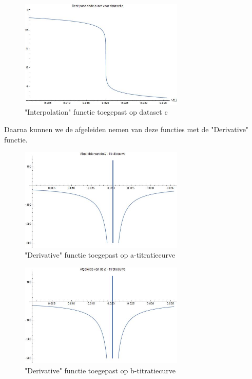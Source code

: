 \documentclass[10pt,twoside]{report}
\begin{document}
\begin{figure}[H]
    \centering
    \includegraphics[width=0.7\textwidth]{c_interpolation.jpg}
    \caption{"Interpolation" functie toegepast op dataset c}
\end{figure}
\newpage
Daarna kunnen we de afgeleiden nemen van deze functies met de "Derivative" functie.\\
\begin{figure}[H]
    \centering
    \includegraphics[width=0.7\textwidth]{a_derivative.jpg}
    \caption{"Derivative" functie toegepast op a-titratiecurve}
\end{figure}
\begin{figure}[H]
    \centering
    \includegraphics[width=0.7\textwidth]{b_derivative.jpg}
    \caption{"Derivative" functie toegepast op b-titratiecurve}
\end{figure}
\end{document}
